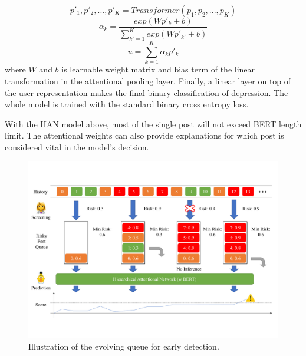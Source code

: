 \begin{equation}
    p'_1, p'_2, ..., p'_K = Transformer(p_1, p_2, ..., p_K)
\end{equation}
\begin{equation}
    \alpha_k = \frac{exp(W p'_k + b)}{\sum_{k'=1}^{K} exp(W p'_{k'} + b)}
\end{equation}
\begin{equation}
    u = \sum_{k=1}^K \alpha_k p'_k
\end{equation}
where $W$ and $b$ is learnable weight matrix and bias term of the linear transformation in the attentional pooling layer. Finally, a linear layer on top of the user representation makes the final binary classification of depression. The whole model is trained with the standard binary cross entropy loss.

With the HAN model above, most of the single post will not exceed BERT length limit.  The attentional weights can also provide explanations for which post is considered vital in the model's decision. %

\begin{figure}[htbp]
    \centering
    \includegraphics[width=1.5\columnwidth]{figures/evolving.pdf}
    \caption{Illustration of the evolving queue for early detection.}
    \label{fig:evolving}
\end{figure}

